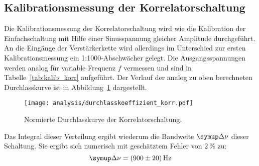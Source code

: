 \subsection{Kalibrationsmessung der Korrelatorschaltung}
%
Die Kalibrationsmessung der Korrelatorschaltung wird wie die Kalibration der Einfachschaltung mit Hilfe einer Sinusspannung gleicher Amplitude durchgeführt. An die Eingänge der Verstärkerkette wird allerdings im Unterschied zur ersten Kalibrationsmessung ein 1:1000-Abschwächer gelegt. Die Ausgangsspannungen werden analog für variable Frequenz $f$ vermessen und sind in Tabelle~\ref{tab:kalib_korr} aufgeführt.
Der Verlauf der analog zu oben berechneten Durchlasskurve ist in Abbildung~\ref{fig:korr_beta} dargestellt.
%
\begin{figure}
  \centering
  \texttt{[image: analysis/durchlasskoeffizient\_korr.pdf]}
  \caption{Normierte Durchlasskurve der Korrelatorschaltung.}
  \label{fig:korr_beta}
\end{figure}
%
Das Integral dieser Verteilung ergibt wiederum die Bandweite $\upD\nu$ dieser Schaltung. Sie ergibt sich numerisch mit geschätztem Fehler von $\SI{2}{\percent}$ zu:
%
\begin{equation}
  \upD\nu = \SI{900(20)}{\hertz}
\end{equation}
%
